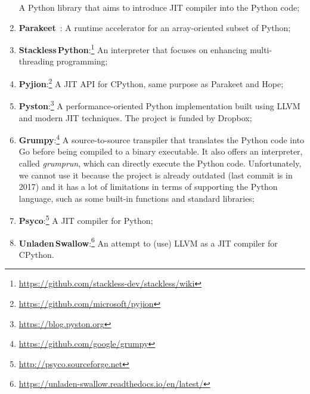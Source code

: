 \begin{enumerate}
            A Python library that aims to introduce JIT compiler into the Python code;
      \item \textbf{Parakeet}~\cite{DBLP:conf/hotpar/RubinsteynHWS12}:
            A runtime accelerator for an array-oriented subset of Python;
      \item \textbf{Stackless\,Python}:\footnote{\url{https://github.com/stackless-dev/stackless/wiki}}
            An interpreter that focuses on enhancing multi-threading programming;
      \item \textbf{Pyjion}:\footnote{\url{https://github.com/microsoft/pyjion}}
            A JIT API for CPython, same purpose as Parakeet and Hope;
      \item \textbf{Pyston}:\footnote{\url{https://blog.pyston.org}}
            A performance-oriented Python implementation built using LLVM and modern JIT techniques.
            The project is funded by Dropbox;
      \item \textbf{Grumpy}:\footnote{\url{https://github.com/google/grumpy}}
            A source-to-source transpiler that translates the Python code into Go before being compiled to a binary executable.
            It also offers an interpreter, called \emph{grumprun}, which can directly execute the Python code.
            Unfortunately, we cannot use it because the project is already outdated (last commit is in 2017) and it has a lot of limitations in terms of supporting the Python language, such as some built-in functions and standard libraries;
      \item \textbf{Psyco}:\footnote{\url{http://psyco.sourceforge.net}}
            A JIT compiler for Python;
      \item \textbf{Unladen\,Swallow}:\footnote{\url{https://unladen-swallow.readthedocs.io/en/latest/}}
            An attempt to (use) LLVM as a JIT compiler for CPython.
\end{enumerate}



